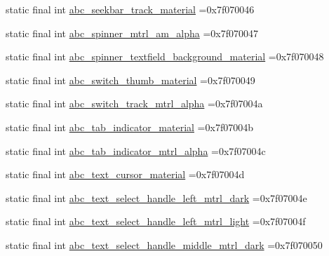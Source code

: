 \begin{DoxyCompactItemize}
\item 
static final int \mbox{\hyperlink{classbr_1_1unb_1_1cic_1_1mp_1_1marketmaster_1_1R_1_1drawable_aad656875025a17076a85b9437992fcda}{abc\+\_\+seekbar\+\_\+track\+\_\+material}} =0x7f070046
\item 
static final int \mbox{\hyperlink{classbr_1_1unb_1_1cic_1_1mp_1_1marketmaster_1_1R_1_1drawable_a223a6d9846b4c9e14b9234c9784a2043}{abc\+\_\+spinner\+\_\+mtrl\+\_\+am\+\_\+alpha}} =0x7f070047
\item 
static final int \mbox{\hyperlink{classbr_1_1unb_1_1cic_1_1mp_1_1marketmaster_1_1R_1_1drawable_a5ad5330a2f6dc6d38034ed29e4a895e8}{abc\+\_\+spinner\+\_\+textfield\+\_\+background\+\_\+material}} =0x7f070048
\item 
static final int \mbox{\hyperlink{classbr_1_1unb_1_1cic_1_1mp_1_1marketmaster_1_1R_1_1drawable_ab07ac9b691ca0230b408aa94e47fc8e6}{abc\+\_\+switch\+\_\+thumb\+\_\+material}} =0x7f070049
\item 
static final int \mbox{\hyperlink{classbr_1_1unb_1_1cic_1_1mp_1_1marketmaster_1_1R_1_1drawable_af8405bee5872b489a742b8b3961fb785}{abc\+\_\+switch\+\_\+track\+\_\+mtrl\+\_\+alpha}} =0x7f07004a
\item 
static final int \mbox{\hyperlink{classbr_1_1unb_1_1cic_1_1mp_1_1marketmaster_1_1R_1_1drawable_a3b90fc895c7b12a439d3898c39a5e1d6}{abc\+\_\+tab\+\_\+indicator\+\_\+material}} =0x7f07004b
\item 
static final int \mbox{\hyperlink{classbr_1_1unb_1_1cic_1_1mp_1_1marketmaster_1_1R_1_1drawable_a3135364e29b84f3acf1572f17c1efcff}{abc\+\_\+tab\+\_\+indicator\+\_\+mtrl\+\_\+alpha}} =0x7f07004c
\item 
static final int \mbox{\hyperlink{classbr_1_1unb_1_1cic_1_1mp_1_1marketmaster_1_1R_1_1drawable_a4396d38d47ebba709d71fe8b43129bc0}{abc\+\_\+text\+\_\+cursor\+\_\+material}} =0x7f07004d
\item 
static final int \mbox{\hyperlink{classbr_1_1unb_1_1cic_1_1mp_1_1marketmaster_1_1R_1_1drawable_af10fded2df821264981b5910b6ee9a1a}{abc\+\_\+text\+\_\+select\+\_\+handle\+\_\+left\+\_\+mtrl\+\_\+dark}} =0x7f07004e
\item 
static final int \mbox{\hyperlink{classbr_1_1unb_1_1cic_1_1mp_1_1marketmaster_1_1R_1_1drawable_abc890c6ad78425cdc9be55ddb4f2860e}{abc\+\_\+text\+\_\+select\+\_\+handle\+\_\+left\+\_\+mtrl\+\_\+light}} =0x7f07004f
\item 
static final int \mbox{\hyperlink{classbr_1_1unb_1_1cic_1_1mp_1_1marketmaster_1_1R_1_1drawable_a1d0f20a8f996e591e65802328c009b24}{abc\+\_\+text\+\_\+select\+\_\+handle\+\_\+middle\+\_\+mtrl\+\_\+dark}} =0x7f070050

\end{DoxyCompactItemize}
